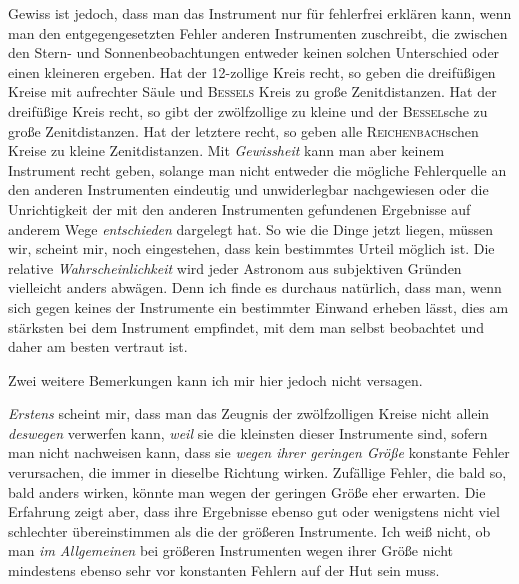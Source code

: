 \par\indent Gewiss ist jedoch, dass man das Instrument nur für fehlerfrei erklären kann, wenn man den entgegengesetzten Fehler anderen Instrumenten zuschreibt, die zwischen den Stern- und Sonnenbeobachtungen entweder keinen solchen Unterschied oder einen kleineren ergeben. Hat der 12-zollige Kreis recht, so geben die dreifüßigen Kreise mit aufrechter Säule und \textsc{Bessels} Kreis zu große Zenitdistanzen. Hat der dreifüßige Kreis recht, so gibt der zwölfzollige zu kleine und der \textsc{Bessel}sche zu große Zenitdistanzen. Hat der letztere recht, so geben alle \textsc{Reichenbach}schen Kreise zu kleine Zenitdistanzen. Mit \emph{Gewissheit} kann man aber keinem Instrument recht geben, solange man nicht entweder die mögliche Fehlerquelle an den anderen Instrumenten eindeutig und unwiderlegbar nachgewiesen oder die Unrichtigkeit der mit den anderen Instrumenten gefundenen Ergebnisse auf anderem Wege \emph{entschieden} dargelegt hat. So wie die Dinge jetzt liegen, müssen wir, scheint mir, noch eingestehen, dass kein bestimmtes Urteil möglich ist. Die relative \emph{Wahrscheinlichkeit} wird jeder Astronom aus subjektiven Gründen vielleicht anders abwägen. Denn ich finde es durchaus natürlich, dass man, wenn sich gegen keines der Instrumente ein bestimmter Einwand erheben lässt, dies am stärksten bei dem Instrument empfindet, mit dem man selbst beobachtet und daher am besten vertraut ist.

\par\indent Zwei weitere Bemerkungen kann ich mir hier jedoch nicht versagen.

\par\indent \emph{Erstens} scheint mir, dass man das Zeugnis der zwölfzolligen Kreise nicht allein \emph{deswegen} verwerfen kann, \emph{weil} sie die kleinsten dieser Instrumente sind, sofern man nicht nachweisen kann, dass sie \emph{wegen ihrer geringen Größe} konstante Fehler verursachen, die immer in dieselbe Richtung wirken. Zufällige Fehler, die bald so, bald anders wirken, könnte man wegen der geringen Größe eher erwarten. Die Erfahrung zeigt aber, dass ihre Ergebnisse ebenso gut oder wenigstens nicht viel schlechter übereinstimmen als die der größeren Instrumente. Ich weiß nicht, ob man \emph{im Allgemeinen} bei größeren Instrumenten wegen ihrer Größe nicht mindestens ebenso sehr vor konstanten Fehlern auf der Hut sein muss.

